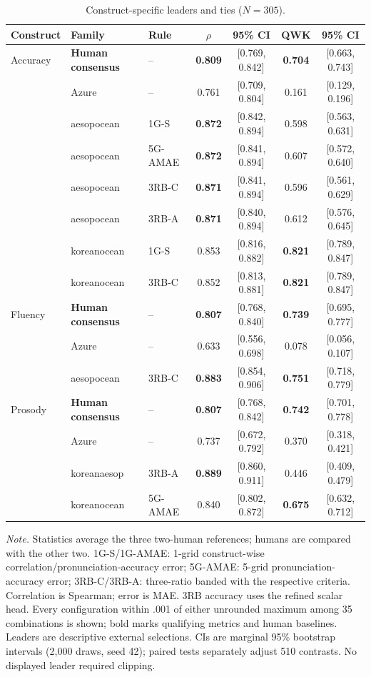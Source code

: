 \documentclass[10pt]{article}
\begin{document}
\begin{table}[H]
\centering
\small
\setlength{\tabcolsep}{5pt}
\renewcommand{\arraystretch}{1.0}
\caption{Construct-specific leaders and ties ($N=305$).}
\label{tab:external}
\begin{tabular}{@{}lllcccc@{}}
\toprule
Construct & Family & Rule & $\rho$ & 95\% CI & QWK & 95\% CI\\
\midrule
Accuracy & \textbf{Human consensus} & -- & \textbf{0.809} & [0.769, 0.842] & \textbf{0.704} & [0.663, 0.743]\\
 & Azure & -- & 0.761 & [0.709, 0.804] & 0.161 & [0.129, 0.196]\\
 & aesopocean & 1G-S & \textbf{0.872} & [0.842, 0.894] & 0.598 & [0.563, 0.631]\\
 & aesopocean & 5G-AMAE & \textbf{0.872} & [0.841, 0.894] & 0.607 & [0.572, 0.640]\\
 & aesopocean & 3RB-C & \textbf{0.871} & [0.841, 0.894] & 0.596 & [0.561, 0.629]\\
 & aesopocean & 3RB-A & \textbf{0.871} & [0.840, 0.894] & 0.612 & [0.576, 0.645]\\
 & koreanocean & 1G-S & 0.853 & [0.816, 0.882] & \textbf{0.821} & [0.789, 0.847]\\
 & koreanocean & 3RB-C & 0.852 & [0.813, 0.881] & \textbf{0.821} & [0.789, 0.847]\\
\midrule
Fluency & \textbf{Human consensus} & -- & \textbf{0.807} & [0.768, 0.840] & \textbf{0.739} & [0.695, 0.777]\\
 & Azure & -- & 0.633 & [0.556, 0.698] & 0.078 & [0.056, 0.107]\\
 & aesopocean & 3RB-C & \textbf{0.883} & [0.854, 0.906] & \textbf{0.751} & [0.718, 0.779]\\
\midrule
Prosody & \textbf{Human consensus} & -- & \textbf{0.807} & [0.768, 0.842] & \textbf{0.742} & [0.701, 0.778]\\
 & Azure & -- & 0.737 & [0.672, 0.792] & 0.370 & [0.318, 0.421]\\
 & koreanaesop & 3RB-A & \textbf{0.889} & [0.860, 0.911] & 0.446 & [0.409, 0.479]\\
 & koreanocean & 5G-AMAE & 0.840 & [0.802, 0.872] & \textbf{0.675} & [0.632, 0.712]\\
\bottomrule
\end{tabular}
\par\smallskip
\begin{minipage}{\textwidth}
\footnotesize
\textit{Note.} Statistics average the three two-human references; humans are compared with the other two. 1G-S/1G-AMAE: 1-grid construct-wise correlation/pronunciation-accuracy error; 5G-AMAE: 5-grid pronunciation-accuracy error; 3RB-C/3RB-A: three-ratio banded with the respective criteria. Correlation is Spearman; error is MAE. 3RB accuracy uses the refined scalar head. Every configuration within .001 of either unrounded maximum among 35 combinations is shown; bold marks qualifying metrics and human baselines. Leaders are descriptive external selections. CIs are marginal 95\% bootstrap intervals (2,000 draws, seed 42); paired tests separately adjust 510 contrasts. No displayed leader required clipping.
\end{minipage}
\end{table}
\end{document}
